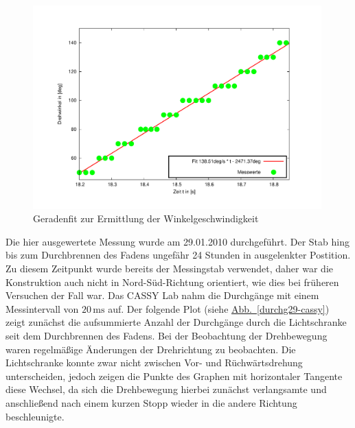 \documentclass[11pt]{scrartcl}
\newcommand{\unit}[1]{\ensuremath{\,\mathrm{#1}}} %
\newcommand{\hypref}[2]{\hyperref[#2]{{#1}~\ref{#2}}}
\begin{document}
\begin{figure}[ht]
\begin{center}
\includegraphics[width=0.99\textwidth]{zeit-winkel29-cassy.pdf}
\end{center}
\vspace{-1.5\baselineskip}
\caption{Geradenfit zur Ermittlung der Winkelgeschwindigkeit}
\label{zeit-winkel29-cassy}
\end{figure}

Die hier ausgewertete Messung wurde am 29.01.2010 durchgef\"uhrt. Der Stab hing bis zum Durchbrennen des Fadens ungef\"ahr 24 Stunden in ausgelenkter Postition. Zu diesem Zeitpunkt wurde bereits der Messingstab verwendet, daher war die Konstruktion auch nicht in Nord-S\"ud-Richtung orientiert, wie dies bei fr\"uheren Versuchen der Fall war. Das CASSY Lab nahm die Durchg\"ange mit einem Messintervall von $20\unit{ms}$ auf. Der folgende Plot (siehe \hypref{Abb.}{durchg29-cassy}) zeigt zun\"achst die aufsummierte Anzahl der Durchg\"ange durch die Lichtschranke seit dem Durchbrennen des Fadens. Bei der Beobachtung der Drehbewegung waren regelm\"a\ss{}ige \"Anderungen der Drehrichtung zu beobachten. Die Lichtschranke konnte zwar nicht zwischen Vor- und R\"uchw\"artsdrehung unterscheiden, jedoch zeigen die Punkte des Graphen mit horizontaler Tangente diese Wechsel, da sich die Drehbewegung hierbei zun\"achst verlangsamte und anschlie\ss{}end nach einem kurzen Stopp wieder in die andere Richtung beschleunigte.
\end{document}
